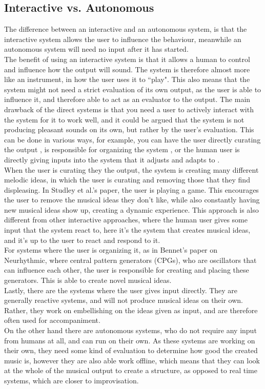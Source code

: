 \documentclass[a4paper,english]{report}
\begin{document}
	\subsection{Interactive vs. Autonomous}
	The difference between an interactive and an autonomous system, is that the interactive system allows the user to influence the behaviour, meanwhile an autonomous system will need no input after it has started.\\
	The benefit of using an interactive system is that it allows a human to control and influence how the output will sound. The system is therefore almost more like an instrument, in how the user uses it to ``play". This also means that the system might not need a strict evaluation of its own output, as the user is able to influence it, and therefore able to act as an evaluator to the output. The main drawback of the direct systems is that you need a user to actively interact with the system for it to work well, and it could be argued that the system is not producing pleasant sounds on its own, but rather by the user's evaluation. This can be done in various ways, for example, you can have the user directly curating the output \cite{studley2019exploring},  is responsible for organizing the system \cite{bennett2018neurythmic}, or the human user is directly giving inputs into the system that it adjusts and adapts to \cite{blackwell2003swarm}.\\
	When the user is curating they the output, the system is creating many different melodic ideas, in which the user is curating and removing those that they find displeasing. In Studley et al.'s paper, the user is playing a game.  This encourages the user to remove the musical ideas they don't like, while also constantly having new musical ideas show up, creating a dynamic experience. This approach is also different from other interactive approaches, where the human user gives some input that the system react to, here it's the system that creates musical ideas, and it's up to the user to react and respond to it.\\
	For systems where the user is organizing it, as in Bennet's paper on Neurhythmic, where central pattern generators (CPGs), who are oscillators that can influence each other, the user is responsible for creating and placing these generators. This is able to create novel musical ideas.\\
	Lastly, there are the systems where the user gives input directly. They are generally reactive systems, and will not produce musical ideas on their own. Rather, they work on embellishing on the ideas given as input, and are therefore often used for accompaniment.\\
	On the other hand there are autonomous systems, who do not require any input from humans at all, and can run on their own. As these systems are working on their own, they need some kind of evaluation to determine how good the created music is, however they are also able work offline, which means that they can look at the whole of the musical output to create a structure, as opposed to real time systems, which are closer to improvisation.
	
\end{document}
